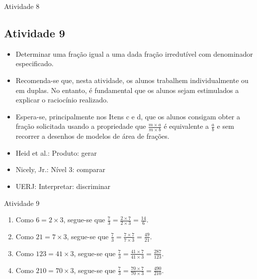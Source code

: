 \begin{multicols}{2}
\begin{resposta*}{Atividade 8}
\begin{enumerate}[a)]
\begin{center}
\end{center}
\end{enumerate}
\end{resposta*}
\Bg
\subsection{Atividade 9}

\begin{itemize} %
    \item       Determinar uma fração igual a uma dada fração irredutível com
denominador especificado.
\end{itemize} %




\begin{itemize} %
    \item       Recomenda-se que, nesta atividade, os alunos trabalhem
individualmente ou em duplas. No entanto, é fundamental que os alunos sejam
estimulados a explicar o raciocínio realizado.
    \item       Espera-se, principalmente nos Itens c e d, que os alunos
consigam obter a fração solicitada usando a propriedade que       $\frac{m
\times a}{m \times b}$       é equivalente a       $\frac{a}{b}$       e sem
recorrer a desenhos de modelos de área de frações.
\end{itemize} %


   \vspace{.1cm}

 \vspace{.1cm}

\begin{itemize} %
    \item       Heid et al.: Produto: gerar
    \item       Nicely, Jr.: Nível 3: comparar
    \item       UERJ: Interpretar: discriminar
\end{itemize} %


\begin{resposta*}{Atividade 9}
\begin{enumerate} [\quad a)] %
    \item       Como       $6 = 2 \times 3$, segue-se que       $\frac{7}{3} =
\frac{2 \times 7}{2 \times 3} = \frac{14}{6}$.
    \item       Como       $21 = 7 \times 3$, segue-se que       $\frac{7}{3} =
\frac{7 \times 7}{7 \times 3} = \frac{49}{21}$.
    \item       Como       $123 = 41 \times 3$, segue-se que       $\frac{7}{3}
= \frac{41 \times 7}{41 \times 3} = \frac{287}{123}$.
    \item       Como       $210 = 70 \times 3$, segue-se que       $\frac{7}{3}
= \frac{70 \times 7}{70 \times 3} = \frac{490}{210}$.
\end{enumerate} %
\end{resposta*}


\end{multicols}
